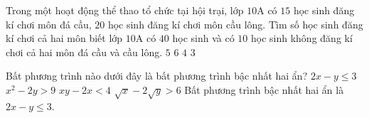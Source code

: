 \begin{ex}%
Trong một hoạt động thể thao tổ chức tại hội trại, lớp $10$A có $15$ học sinh đăng kí chơi môn đá cầu, $20$ học sinh đăng kí chơi môn cầu lông. Tìm số học sinh đăng kí chơi cả hai môn biết lớp $10$A có $40$ học sinh và có $10$ học sinh không đăng kí chơi cả hai môn đá cầu và cầu lông.
\choice
{\True $5$}
{$6$}
{$4$}
{$3$}
\end{ex}

\begin{ex}%
Bất phương trình nào dưới đây là bất phương trình bậc nhất hai ẩn?
\choice
{\True $2x-y \leq 3$}
{$x^2-2y>9$}
{$xy-2x<4$}
{$\sqrt{x}-2\sqrt{y}>6$}
\loigiai
{
Bất phương trình bậc nhất hai ẩn là $2x-y \leq 3$.
}
\end{ex}

